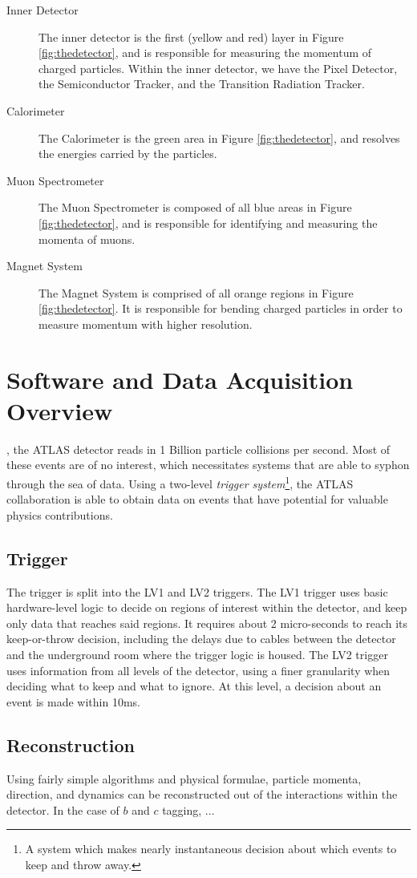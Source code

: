 \begin{description}
	\item[Inner Detector] The inner detector is the first (yellow and red) layer in Figure \ref{fig:thedetector}, and is responsible for measuring the momentum of charged particles. Within the inner detector, we have the Pixel Detector, the Semiconductor Tracker, and the Transition Radiation Tracker.
	
	\item[Calorimeter] The Calorimeter is the green area in Figure \ref{fig:thedetector}, and resolves the energies carried by the particles.
	
	\item[Muon Spectrometer] The Muon Spectrometer is composed of all blue areas in Figure \ref{fig:thedetector}, and is responsible for identifying and measuring the momenta of muons.
	
	\item[Magnet System] The Magnet System is comprised of all orange regions in Figure \ref{fig:thedetector}. It is responsible for bending charged particles in order to measure momentum with higher resolution. 
\end{description}

\section{Software and Data Acquisition Overview}

, the ATLAS detector reads in 1 Billion particle collisions per second. Most of these events are of no interest, which necessitates systems that are able to syphon through the sea of data. Using a two-level \emph{trigger system}\footnote{A system which makes nearly instantaneous decision about which events to keep and throw away.}, the ATLAS collaboration is able to obtain data on events that have potential for valuable physics contributions. 

\subsection{Trigger}

The trigger is split into the LV1 and LV2 triggers. The LV1 trigger uses basic hardware-level logic to decide on regions of interest within the detector, and keep only data that reaches said regions. It requires about 2 micro-seconds to reach its keep-or-throw decision, including the delays due to cables between the detector and the underground room where the trigger logic is housed. The LV2 trigger uses information from all levels of the detector, using a finer granularity when deciding what to keep and what to ignore. At this level, a decision about an event is made within 10ms.

\subsection{Reconstruction}

Using fairly simple algorithms and physical formulae, particle momenta, direction, and dynamics can be reconstructed out of the interactions within the detector. In the case of $b$ and $c$ tagging, ...




